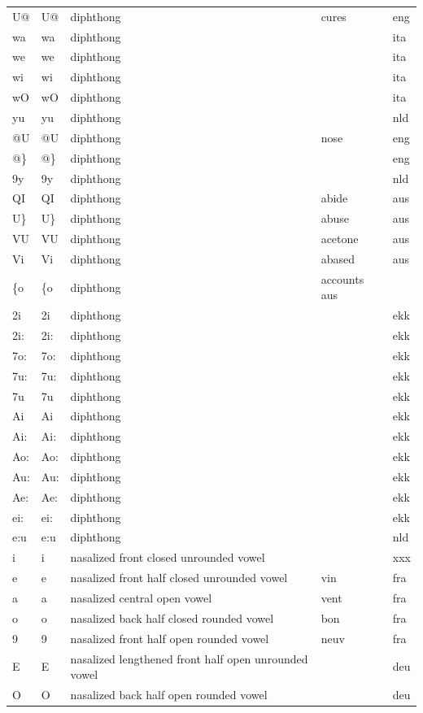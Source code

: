 \documentclass[twoside,a4paper]{book}
\begin{document}
\begin{longtable}{lllll}
	U@ & U@ & diphthong & cures & eng\\
	wa & wa & diphthong & & ita\\
	we & we & diphthong & & ita\\
	wi & wi & diphthong & & ita\\
	wO & wO & diphthong & & ita\\
	yu & yu & diphthong & & nld\\
	@U & @U & diphthong & nose & eng\\
	@\} & @\} & diphthong & & eng\\
	9y & 9y & diphthong & & nld\\
	QI & QI & diphthong & abide & aus\\
	U\} & U\} & diphthong & abuse & aus\\
	VU & VU & diphthong & acetone & aus\\
	Vi & Vi & diphthong & abased & aus\\
	\{o & \{o & diphthong & accounts aus\\
	2i & 2i & diphthong & & ekk\\
	2i: & 2i: & diphthong & & ekk\\
	7o: & 7o: & diphthong & & ekk\\
	7u: & 7u: & diphthong & & ekk\\
	7u & 7u & diphthong & & ekk\\
	Ai & Ai & diphthong & & ekk\\
	Ai: & Ai: & diphthong & & ekk\\
	Ao: & Ao: & diphthong & & ekk\\
	Au: & Au: & diphthong & & ekk\\
	Ae: & Ae: & diphthong & & ekk\\
	ei: & ei: & diphthong & & ekk\\
	e:u & e:u & diphthong & & nld\\
	i~ & i~ & nasalized front closed unrounded vowel & & xxx\\
	e~ & e~ & nasalized front half closed unrounded vowel & vin & fra\\
	a~ & a~ & nasalized central open vowel & vent & fra\\
	o~ & o~ & nasalized back half closed rounded vowel & bon & fra\\
	9~ & 9~ & nasalized front half open rounded vowel & neuv & fra\\
	E~ & E~ & nasalized lengthened front half open unrounded vowel & & deu\\
	O~ & O~ & nasalized back half open rounded vowel & & deu\\

\end{longtable}
\end{document}
